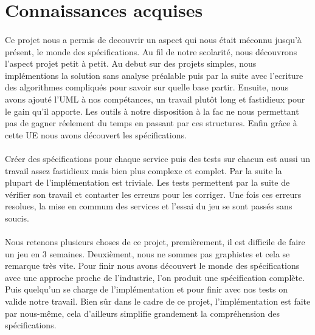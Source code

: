 \documentclass[a4paper,titlepage,openany,12pt]{report}
\begin{document}
\section*{Connaissances acquises}
\paragraph{}
Ce projet nous a permis de decouvrir un aspect qui nous était méconnu
jusqu'à présent, le monde des spécifications.
Au fil de notre scolarité, nous découvrons l'aspect projet petit à
petit.
Au debut sur des projets simples, nous implémentions la solution sans
analyse préalable puis par la suite avec l'ecriture des algorithmes
compliqués pour savoir sur quelle base partir.
Ensuite, nous avons ajouté l'UML à nos compétances, un travail plutôt
long et fastidieux pour le gain qu'il apporte. Les outils à notre
disposition à la fac ne nous permettant pas de gagner réelement du
temps en passant par ces structures.
Enfin grâce à cette UE nous avons découvert les spécifications.

\paragraph{}
Créer des spécifications pour chaque service puis des tests sur
chacun est aussi un travail assez fastidieux mais bien plus complexe
et complet. Par la suite la plupart de l'implémentation est triviale.
Les tests permettent par la suite de vérifier son travail et contaster
les erreurs pour les corriger.
Une fois ces erreurs resolues, la mise en commum des services et l'essai
du jeu se sont passés sans soucis.

\paragraph{}
Nous retenons plusieurs choses de ce projet, premièrement, il est
difficile de faire un jeu en 3 semaines.
Deuxièment, nous ne sommes pas graphistes et cela se remarque très
vite.
Pour finir nous avons découvert le monde des spécifications avec une
approche proche de l'industrie, l'on produit une spécification
complète. Puis quelqu'un se charge de l'implémentation et pour finir
avec nos tests on valide notre travail.
Bien sûr dans le cadre de ce projet, l'implémentation est faite par
nous-même, cela d'ailleurs simplifie grandement la compréhension des
spécifications.
\end{document}
